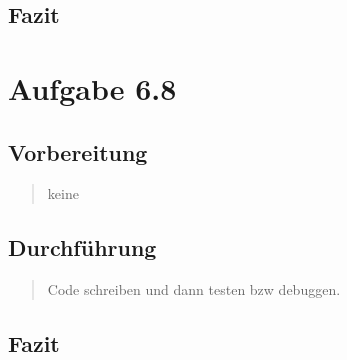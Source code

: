 \subsection{Fazit}
\begin{quote}
	
\end{quote}


\section{Aufgabe 6.8}
\subsection{Vorbereitung}
\begin{quote}
	keine
\end{quote}
\subsection{Durchführung}
\begin{quote}
	Code schreiben und dann testen bzw debuggen.
\end{quote}
\subsection{Fazit}
\begin{quote}
	
\end{quote}